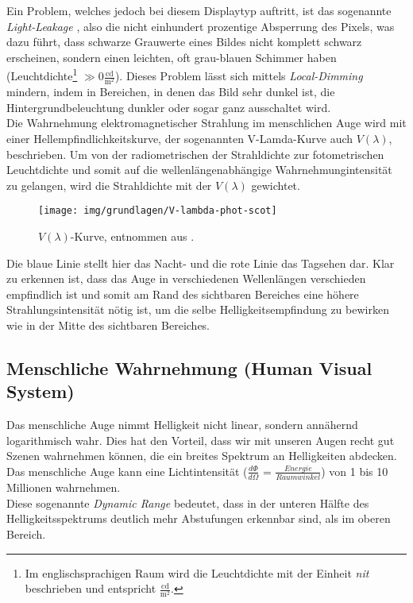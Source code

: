 Ein Problem, welches jedoch bei diesem Displaytyp auftritt, ist das sogenannte \emph{Light-Leakage} \cite{light_leakage}, also die nicht einhundert prozentige Absperrung des Pixels, was dazu führt, dass schwarze Grauwerte eines Bildes nicht komplett schwarz erscheinen, sondern einen leichten, oft grau-blauen\cite[p.~71]{light_leakage_color} Schimmer haben (Leuchtdichte\footnote{Im englischsprachigen Raum wird die Leuchtdichte mit der Einheit \emph{nit} beschrieben und entspricht $ \mathrm{\frac{cd}{m^2}} $. } $ \gg 0 \mathrm{\frac{cd}{m^2}} $). Dieses Problem lässt sich mittels \textit{Local-Dimming} mindern, indem in Bereichen, in denen das Bild sehr dunkel ist, die Hintergrundbeleuchtung dunkler oder sogar ganz ausschaltet wird.\\
Die Wahrnehmung elektromagnetischer Strahlung im menschlichen Auge wird mit einer Hellempfindlichkeitskurve, der sogenannten V-Lamda-Kurve auch $ V(\lambda) $, beschrieben. Um von der radiometrischen der Strahldichte zur fotometrischen Leuchtdichte und somit auf die wellenlängenabhängige Wahrnehmungintensität zu gelangen, wird die Strahldichte mit der $ V(\lambda) $ gewichtet.
\begin{figure}[H]
	\centering
	\texttt{[image: img/grundlagen/V-lambda-phot-scot]}
	\caption{$ V(\lambda) $-Kurve, entnommen aus \cite{v_lambda_IMG}.}
	\label{fig:v-lambda}
\end{figure}

Die blaue Linie stellt hier das Nacht- und die rote Linie das Tagsehen dar. Klar zu erkennen ist, dass das Auge in verschiedenen Wellenlängen verschieden empfindlich ist und somit am Rand des sichtbaren Bereiches eine höhere Strahlungsintensität nötig ist, um die selbe Helligkeitsempfindung zu bewirken wie in der Mitte des sichtbaren Bereiches.\cite{v_lambda}

\subsection{Menschliche Wahrnehmung (Human Visual System)}
\label{subsec:human_visual_system_Gamma}

Das menschliche Auge nimmt Helligkeit nicht linear, sondern annähernd logarithmisch wahr. Dies hat den Vorteil, dass wir mit unseren Augen recht gut Szenen wahrnehmen können, die ein breites Spektrum an Helligkeiten abdecken. Das menschliche Auge kann eine Lichtintensität ($\frac{d \Phi}{d \Omega}$ = $\frac{Energie}{Raumwinkel}$) von 1 bis 10 Millionen wahrnehmen.\cite[p.~33]{light_intensity} \\
Diese sogenannte \textit{Dynamic Range} bedeutet, dass in der unteren Hälfte des Helligkeitsspektrums deutlich mehr Abstufungen erkennbar sind, als im oberen Bereich.

